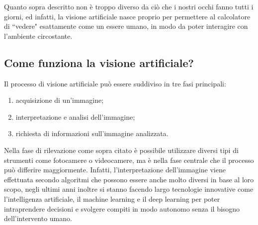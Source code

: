 \documentclass[12pt,a4paper,openright,twoside]{book}
\begin{document}
Quanto sopra descritto non è troppo diverso da ciò che i nostri occhi fanno tutti i giorni, ed infatti, la visione artificiale nasce proprio per permettere al calcolatore di ``vedere" esattamente come un essere umano, in modo da poter interagire con l'ambiente circostante.

\pagebreak
\subsection{Come funziona la visione artificiale?}
Il processo di visione artificiale può essere suddiviso in tre fasi principali:
\begin{enumerate}
	\item acquisizione di un'immagine;
	\item interpretazione e analisi dell'immagine;
	\item richiesta di informazioni sull'immagine analizzata.
\end{enumerate}
Nella fase di rilevazione come sopra citato è possibile utilizzare diversi tipi di strumenti come fotocamere o videocamere, ma è nella fase centrale che il processo può differire maggiormente. Infatti, l'interpretazione dell'immagine viene effettuata secondo algoritmi che possono essere anche molto diversi in base al loro scopo, negli ultimi anni inoltre si stanno facendo largo tecnologie innovative come l'intelligenza artificiale, il machine learning e il deep learning per poter intraprendere decisioni e svolgere compiti in modo autonomo senza il bisogno dell'intervento umano.
\end{document}
